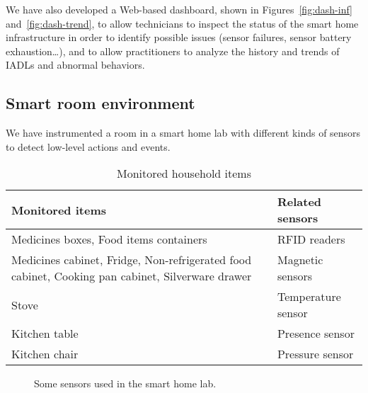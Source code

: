 \documentclass[10pt, conference, compsocconf]{IEEEtran}
\begin{document}
We have also developed a Web-based dashboard,
shown in Figures~\ref{fig:dash-inf} and~\ref{fig:dash-trend}, 
to allow technicians to inspect the
status of the smart home infrastructure in order to identify possible issues 
(sensor failures, sensor battery exhaustion\ldots), and to allow practitioners
to analyze the history and trends of IADLs and abnormal behaviors.



\subsection{Smart room environment}
We have instrumented a room in a smart home lab with different
kinds of sensors to detect low-level actions and events.

\begin{table}[!ht] 
\caption{Monitored household items}
\label{table:sensors}
\centering
\begin{tabularx}{.9\columnwidth}{|X|l|}
\hline
\textbf{Monitored items} & \textbf{Related sensors} \\
\hline\hline
Medicines boxes, Food items containers & {RFID readers} \\
\hline
Medicines cabinet, Fridge, Non-refrigerated food cabinet, Cooking pan cabinet, Silverware drawer & {Magnetic sensors} \\
\hline
Stove & Temperature sensor \\
\hline 
Kitchen table & {Presence sensor} \\
\hline
Kitchen chair & Pressure sensor \\ 
\hline 
\end{tabularx} 
\end{table}

\begin{figure*}[t!]
\centering
{}
\caption{Some sensors used in the smart home lab.\label{fig:sensors}}
\end{figure*}
\end{document}
